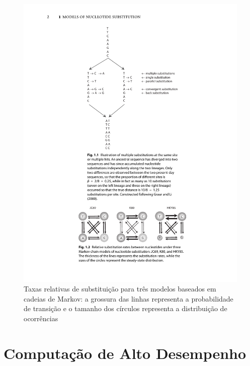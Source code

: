 \documentclass[english,brazilian]{UNISINOSmonografia} %
\newcommand\defaultFigureWidth{0.9}
\begin{document}
\begin{figure}[tb]
	\centering%
	\begin{minipage}{\defaultFigureWidth\textwidth}
		\caption[Taxas relativas de substituição para três modelos baseados em cadeias de Markov]{Taxas relativas de substituição para três modelos baseados em cadeias de Markov: a grossura das linhas representa a probabilidade de transição e o tamanho dos círculos representa a distribuição de ocorrências}
		\label{fig:models}
		\includegraphics[trim=130 95 120 500,clip,width=\textwidth]{yang2014molecular-fig1-2}
	\end{minipage}
\end{figure}




\section{Computação de Alto Desempenho}
\label{sec:computacao}
\end{document}
